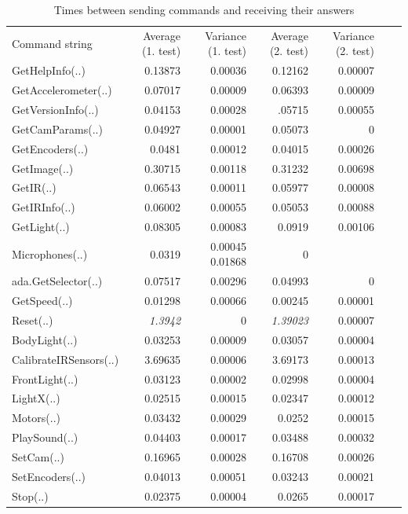 \begin{table}[!hbp]
\begin{tabular}{lrrrrrr}
Command string & {\small Average (1. test)}  & {\small Variance (1. test)}& {\small Average (2. test)} & {\small Variance (2. test)}\\
GetHelpInfo(..)& 0.13873 & 0.00036& 0.12162&0.00007\\
GetAccelerometer(..)&0.07017&0.00009&  0.06393&0.00009\\ 
GetVersionInfo(..)&0.04153&0.00028&.05715&0.00055\\ 
GetCamParams(..)&0.04927&0.00001&  0.05073&0\\ 
GetEncoders(..)&0.0481&0.00012&  0.04015&0.00026\\ 
GetImage(..)&0.30715 &0.00118& 0.31232&0.00698\\ 
GetIR(..)&0.06543 &0.00011&0.05977&0.00008\\ 
GetIRInfo(..)&0.06002 &0.00055& 0.05053&0.00088\\
GetLight(..)&0.08305 &0.00083&0.0919&0.00106\\
Microphones(..)& 0.0319&0.00045 0.01868&0\\
ada.GetSelector(..)& 0.07517&0.00296& 0.04993& 0\\
GetSpeed(..)& 0.01298&0.00066&   0.00245&0.00001\\
Reset(..) &{\it 1.3942} & 0 &{\it 1.39023} &0.00007 \\
BodyLight(..)& 0.03253&0.00009&   0.03057&0.00004\\
CalibrateIRSensors(..)&3.69635&0.00006&3.69173&0.00013\\
FrontLight(..)&0.03123&0.00002 & 0.02998&0.00004\\
LightX(..)& 0.02515&0.00015&  0.02347&0.00012\\
Motors(..)&0.03432&0.00029&  0.0252&0.00015\\
PlaySound(..)& 0.04403& 0.00017&  0.03488&0.00032\\
SetCam(..)& 0.16965& 0.00028& 0.16708&0.00026\\
SetEncoders(..)& 0.04013&0.00051& 0.03243&0.00021\\
Stop(..)&0.02375&0.00004&  0.0265&0.00017\\
\end{tabular}
\caption{Times between sending commands and receiving their answers}
\label{times1}
\end{table}

